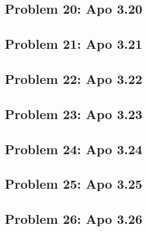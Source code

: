 \subsection[Problem 20]{Problem 20: Apo 3.20}

\subsection[Problem 21]{Problem 21: Apo 3.21}

\subsection[Problem 22]{Problem 22: Apo 3.22}

\subsection[Problem 23]{Problem 23: Apo 3.23}

\subsection[Problem 24]{Problem 24: Apo 3.24}

\subsection[Problem 25]{Problem 25: Apo 3.25}

\subsection[Problem 26]{Problem 26: Apo 3.26}

